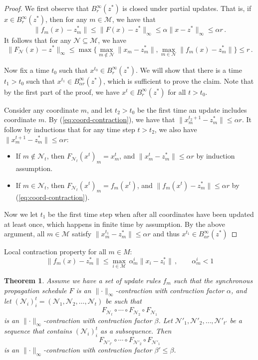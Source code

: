 \documentclass[11pt,a4paper]{article}
\newtheorem{theorem}{Theorem}
\theoremstyle{remark}
\newcommand{\M}{\mathcal{M}}
\newcommand{\N}{\mathcal{N}}
\newcommand{\norm}[1]{\lVert #1 \rVert}
\begin{document}
\begin{proof} We first observe that $B^\infty_r(z^*)$ is closed under partial updates. That is, if $x \in B^\infty_r(z^*)$, then for any $m \in \M$, we have that
\begin{equation}\label{eq:coord-contraction}
\norm{f_m(x) - z_m^*} \le \norm{F(x) - z^*}_\infty \le \alpha \norm{x - z^*}_\infty \le \alpha r\,.
\end{equation}
It follows that for any $\N \subseteq \M$, we have
\[ \norm{F_\N(x) - z^*}_\infty \le \max \bigl\{ \max_{m \notin \N} \norm{x_m - z_m^*}, \max_{m \in \N} \norm{f_m(x) - z_m^*}  \bigr\} \le r\,.\]
    
Now fix a time $t_0$ such that $x^{t_0} \in B^\infty_r(z^*)$. We will show that there is a time $t_1 > t_0 $ such that $x^{t_1} \in B^\infty_{\alpha r}(z^*)$, which is sufficient to prove the claim. Note that by the first part of the proof, we have $x^t \in B^\infty_r(z^*)$ for all $t > t_0$.

Consider any coordinate $m$, and let $t_2 > t_0$ be the first time an update includes coordinate $m$. By (\ref{eq:coord-contraction}), we have that $\norm{x^{t_2+1}_m - z_m^*} \le \alpha r$. It follow by inductions that for any time step $t > t_2$, we also have $\norm{x^{t+1}_m - z_m^*} \le \alpha r$:
\begin{itemize}
    \item If $m \notin \N_{t}$, then $F_{\N_{t}}(x^{t})_m = x^{t}_m$, and $\norm{x^{t}_m - z_m^*} \le \alpha r$ by induction assumption.
    \item If $m \in \N_{t}$, then $F_{\N_{t}}(x^{t})_m = f_m(x^{t})$, and $\norm{f_m(x^{t}) - z_m^*} \le \alpha r$ by (\ref{eq:coord-contraction}).
\end{itemize}
Now we let $t_1$ be the first time step when after all coordinates have been updated at least once, which happens in finite time by assumption. By the above argument, all $m \in \M$ satisfy $\norm{x^{t_1}_m - z_m^*} \le \alpha r$ and thus $x^{t_1} \in B^\infty_{\alpha r}(z^*)$
\end{proof}

Local contraction property for all $m \in M$:
\[ \norm{f_m(x) - z_m^* } \le \max_{i \in \M} \, \alpha^i_m \norm{ x_i - z_i^* }\,,\qquad \alpha^i_m < 1  \]


\begin{theorem}
Assume we have a set of update rules $f_m$ such that the synchronous propagation schedule $F$ is an $\norm{\cdot}_\infty$-contraction with contraction factor $\alpha$, and let $(\N_i)_i^t = (\N_1, \N_2, \dotsc, \N_t)$ be such that
\[ F_{\N_{t}} \circ \dotsb \circ F_{\N_{2}} \circ F_{\N_{1}} \]
is an $\norm{\cdot}_\infty$-contraction with contraction factor $\beta$. Let $\N'_1, \N'_2, \dotsc, \N'_{t'}$ be a sequence that contains $(\N_i)_i^t$ as a subsequence. Then 
\[ F_{\N'_{t'}} \circ \dotsb \circ F_{\N'_{2}} \circ F_{\N'_{1}} \]
is an $\norm{\cdot}_\infty$-contraction with contraction factor $\beta' \le \beta$.
\end{theorem}
\end{document}
